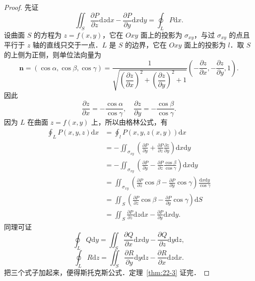 \begin{proof}
先证
\[
\iint_{S}\frac{\partial P}{\partial z}\mathrm{d}z\mathrm{d}x-\frac{\partial P}{\partial y}\mathrm{d}x\mathrm{d}y=\oint_{L}P\mathrm{d}x.
\]
设曲面 $S$ 的方程为 $z=f(x,y)$，它在 $Oxy$ 面上的投影为 $\sigma_{xy}$，与过 $\sigma_{xy}$ 的点且平行于 $z$ 轴的直线只交于一点．$L$ 是 $S$ 的边界，它在 $Oxy$ 面上的投影为 $l$．取 $S$ 的上侧为正侧，则单位法向量为
\[
\bm{n}=(\cos\alpha,\cos\beta,\cos\gamma)=\frac{1}{\sqrt{\left(\dfrac{\partial z}{\partial x}\right)^{2}+\left(\dfrac{\partial z}{\partial y}\right)^{2}+1}}\left(-\frac{\partial z}{\partial x},-\frac{\partial z}{\partial y},1\right).
\]
因此
\[
\frac{\partial z}{\partial x}=-\frac{\cos\alpha}{\cos\gamma},\quad\frac{\partial z}{\partial y}=-\frac{\cos\beta}{\cos\gamma}.
\]
因为 $L$ 在曲面 $z=f(x,y)$ 上，所以由格林公式，有
\[
\begin{aligned}
\oint_{L}P(x,y,z)\mathrm{d}x&=\oint_{l}P(x,y,z(x,y))\mathrm{d}x\\
&=-\iint_{\sigma_{xy}}\left(\frac{\partial P}{\partial y}+\frac{\partial P}{\partial z}\frac{\partial z}{\partial y}\right)\mathrm{d}x\mathrm{d}y\\
&=-\iint_{\sigma_{xy}}\left(\frac{\partial P}{\partial y}-\frac{\partial P}{\partial z}\frac{\cos\beta}{\cos\gamma}\right)\mathrm{d}x\mathrm{d}y\\
&=\iint_{\sigma_{xy}}\left(\frac{\partial P}{\partial z}\cos\beta-\frac{\partial P}{\partial y}\cos\gamma\right)\frac{\mathrm{d}x\mathrm{d}y}{\cos\gamma}\\
&=\iint_{S}\left(\frac{\partial P}{\partial z}\cos\beta-\frac{\partial P}{\partial y}\cos\gamma\right)\mathrm{d}S\\
&=\iint_{S}\frac{\partial P}{\partial z}\mathrm{d}z\mathrm{d}x-\frac{\partial P}{\partial y}\mathrm{d}x\mathrm{d}y.
\end{aligned}
\]
同理可证
\[
\oint_{L}Q\mathrm{d}y=\iint_{S}\frac{\partial Q}{\partial x}\mathrm{d}x\mathrm{d}y-\frac{\partial Q}{\partial z}\mathrm{d}y\mathrm{d}z,
\]
\[
\oint_{L}R\mathrm{d}z=\iint_{S}\frac{\partial R}{\partial y}\mathrm{d}y\mathrm{d}z-\frac{\partial R}{\partial x}\mathrm{d}z\mathrm{d}x.
\]
把三个式子加起来，便得斯托克斯公式．定理~\ref{thm:22-3} 证完．
\end{proof}

